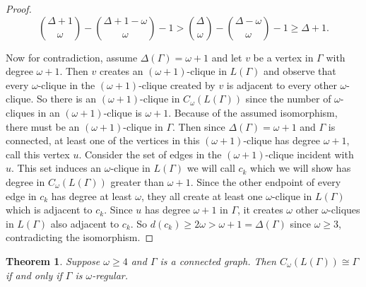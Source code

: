 \documentclass[12pt]{report}
\newtheorem{thm}{Theorem}[chapter]
\theoremstyle{definition}
\begin{document}
\begin{proof}
    \[\binom{\Delta+1}{\omega}-\binom{\Delta+1-\omega}{\omega}-1 > \binom{\Delta}{\omega}-\binom{\Delta-\omega}{\omega}-1 \geq \Delta+1.\]\par
    Now for contradiction, assume $\Delta(\Gamma) = \omega +1$ and let $v$ be a vertex in $\Gamma$ with degree $\omega +1$. Then $v$ creates an $(\omega +1)$-clique in $L(\Gamma)$ and observe that every $\omega$-clique in the $(\omega+1)$-clique created by $v$ is adjacent to every other $\omega$-clique. So there is an $(\omega+1)$-clique in $C_\omega(L(\Gamma))$ since the number of $\omega$-cliques in an $(\omega+1)$-clique is $\omega+1$. Because of the assumed isomorphism, there must be an $(\omega+1)$-clique in $\Gamma$. Then since $\Delta(\Gamma)=\omega+1$ and $\Gamma$ is connected, at least one of the vertices in this $(\omega+1)$-clique has degree $\omega+1$, call this vertex $u$. Consider the set of edges in the $(\omega+1)$-clique incident with $u$. This set induces an $\omega$-clique in $L(\Gamma)$ we will call $c_k$ which we will show has degree in $C_\omega(L(\Gamma))$ greater than $\omega +1$. Since the other endpoint of every edge in $c_k$ has degree at least $\omega$, they all create at least one $\omega$-clique in $L(\Gamma)$ which is adjacent to $c_k$. Since $u$ has degree $\omega+1$ in $\Gamma$, it creates $\omega$ other $\omega$-cliques in $L(\Gamma)$ also adjacent to $c_k$. So $d(c_k) \geq 2\omega > \omega +1 = \Delta(\Gamma)$ since $\omega \geq 3$, contradicting the isomorphism.
\end{proof}
\begin{thm} \label{thm:4ci}
    Suppose $\omega \geq 4$ and $\Gamma$ is a connected graph. Then $C_\omega(L(\Gamma)) \cong \Gamma$ if and only if $\Gamma$ is $\omega$-regular.
\end{thm}
\end{document}
